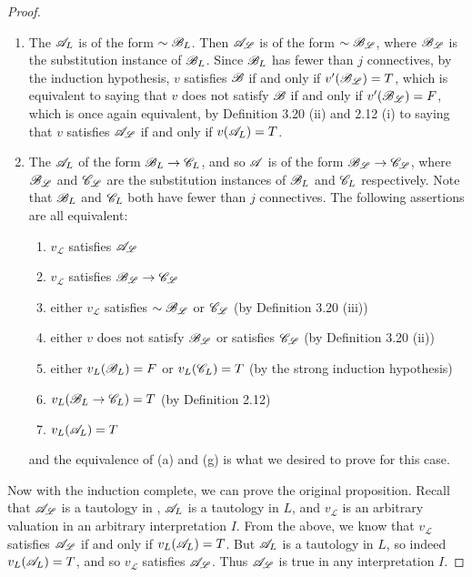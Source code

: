\begin{proposition}
\begin{proof}
    \begin{enumerate}
      \item The \wf{} \(\mathscr{A}_L\) is of the form \(\sim\mathscr{B}_L\). Then \(\mathscr{A}_{\mathscr{L}}\) is of the form \(\sim\mathscr{B}_{\mathscr{L}}\), where \(\mathscr{B}_{\mathscr{L}}\) is the substitution instance of \(\mathscr{B}_L\). Since \(\mathscr{B}_L\) has fewer than \(j\) connectives, by the induction hypothesis, \(v\) satisfies \(\mathscr{B}\) if and only if \(v'(\mathscr{B}_{\mathscr{L}}) = T\), which is equivalent to saying that \(v\) does not satisfy \(\mathscr{B}\) if and only if \(v'(\mathscr{B}_{\mathscr{L}}) = F\), which is once again equivalent, by Definition 3.20 (ii) and 2.12 (i) to saying that \(v\) satisfies \(\mathscr{A}_{\mathscr{L}}\) if and only if \(v(\mathscr{A}_L) = T\).

      \item The \wf{} \(\mathscr{A}_L\) of the form \(\mathscr{B}_L \rightarrow \mathscr{C}_L\), and so \(\mathscr{A}\) is of the form \(\mathscr{B}_{\mathscr{L}} \rightarrow \mathscr{C}_{\mathscr{L}}\), where \(\mathscr{B}_{\mathscr{L}}\) and \(\mathscr{C}_{\mathscr{L}}\) are the substitution instances of \(\mathscr{B}_L\) and \(\mathscr{C}_L\) respectively. Note that \(\mathscr{B}_L\) and \(\mathscr{C}_L\) both have fewer than \(j\) connectives. The following assertions are all equivalent:
        \begin{enumerate}[align=left]
          \item \(v_{\mathscr{L}}\) satisfies \(\mathscr{A}_{\mathscr{L}}\)
          \item \(v_{\mathscr{L}}\) satisfies \(\mathscr{B}_{\mathscr{L}} \rightarrow \mathscr{C}_{\mathscr{L}}\)
          \item either \(v_{\mathscr{L}}\) satisfies \(\sim\mathscr{B}_{\mathscr{L}}\) or \(\mathscr{C}_{\mathscr{L}}\) (by Definition 3.20 (iii))
          \item either \(v\) does not satisfy \(\mathscr{B}_{\mathscr{L}}\) or satisfies \(\mathscr{C}_{\mathscr{L}}\) (by Definition 3.20 (ii))
          \item either \(v_L(\mathscr{B}_L) = F\) or \(v_L(\mathscr{C}_L) = T\) (by the strong induction hypothesis)
          \item \(v_L(\mathscr{B}_L \rightarrow \mathscr{C}_L) = T\) (by Definition 2.12)
          \item \(v_L(\mathscr{A}_L) = T\)
        \end{enumerate}
        and the equivalence of (a) and (g) is what we desired to prove for this case.
    \end{enumerate}

    Now with the induction complete, we can prove the original proposition. Recall that \(\mathscr{A}_{\mathscr{L}}\) is a tautology in \cl{}, \(\mathscr{A}_L\) is a tautology in \(L\), and \(v_{\mathscr{L}}\) is an arbitrary valuation in an arbitrary interpretation \(I\). From the above, we know that \(v_{\mathscr{L}}\) satisfies \(\mathscr{A}_{\mathscr{L}}\) if and only if \(v_L(\mathscr{A}_L) = T\). But \(\mathscr{A}_L\) is a tautology in \(L\), so indeed \(v_L(\mathscr{A}_L) = T\), and so \(v_{\mathscr{L}}\) satisfies \(\mathscr{A}_{\mathscr{L}}\). Thus \(\mathscr{A}_{\mathscr{L}}\) is true in any interpretation \(I\).
  \end{proof}


\end{proposition}
